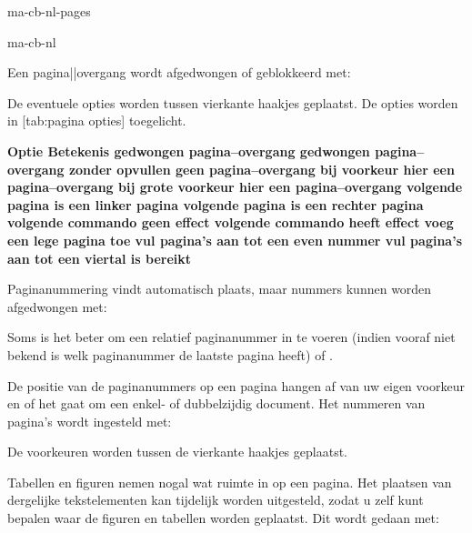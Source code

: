 \startonderdeel ma-cb-nl-pages

\produkt ma-cb-nl




Een pagina||overgang wordt afgedwongen of geblokkeerd met:


De eventuele opties worden tussen vierkante haakjes
geplaatst. De opties worden in [tab:pagina opties]
toegelicht.

\starttabel[|l|l|]
\HL
\NC \bf Optie \NC \bf Betekenis \NC\SR
\HL
\NC {}            \NC gedwongen pagina--overgang \NC\FR
\NC {}        \NC gedwongen pagina--overgang zonder opvullen \NC\MR
\NC {}           \NC geen pagina--overgang \NC\MR
\NC {}      \NC bij voorkeur hier een pagina--overgang \NC\MR
\NC {} \NC bij grote voorkeur hier een pagina--overgang \NC\MR
\NC {}         \NC volgende pagina is een linker pagina \NC\MR
\NC {}        \NC volgende pagina is een rechter pagina  \NC\MR
\NC {}      \NC volgende commando geen effect \NC\MR
\NC {}         \NC volgende commando heeft effect \NC\MR
\NC {}          \NC voeg een lege pagina toe \NC\MR
\NC {}       \NC vul pagina's aan tot een even nummer \NC\MR
\NC {}       \NC vul pagina's aan tot een viertal is bereikt \NC\LR
\HL
\stoptabel

Paginanummering vindt automatisch plaats, maar nummers
kunnen worden afgedwongen met:

\starttypen
\pagina[25]
\stoptypen

Soms is het beter om een relatief paginanummer in te voeren
(indien vooraf niet bekend is welk paginanummer de laatste
pagina heeft) \type{[+2]} of \type{[-2]}.

De positie van de paginanummers op een pagina hangen af van
uw eigen voorkeur en of het gaat om een enkel- of
dubbelzijdig document. Het nummeren van pagina's wordt
ingesteld met:


De voorkeuren worden tussen de vierkante haakjes geplaatst.

Tabellen en figuren nemen nogal wat ruimte in op een pagina.
Het plaatsen van dergelijke tekstelementen kan tijdelijk
worden uitgesteld, zodat u zelf kunt bepalen waar de figuren
en tabellen worden geplaatst. Dit wordt gedaan met:


